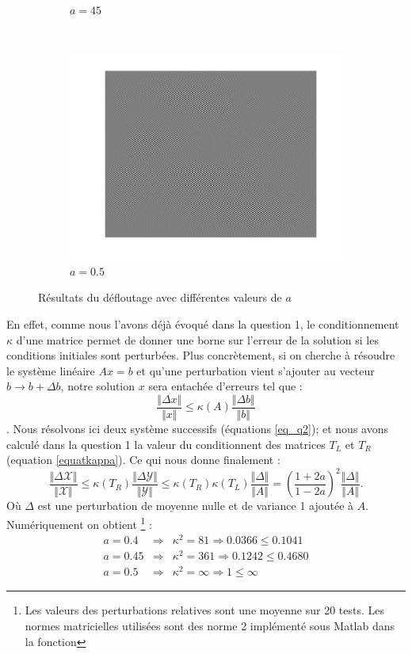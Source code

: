 \begin{figure}
\begin{subfigure}[b]{0.3\textwidth}
    \caption{$a = 45$}
    \label{fig:a45}
  \end{subfigure}%
  ~
  \begin{subfigure}[b]{0.3\textwidth}
    \includegraphics[width=\textwidth]{Q2/unblurred_50.png}
    \caption{$a = 0.5$}
    \label{fig:a5}
  \end{subfigure}
  \caption{Résultats du défloutage avec différentes valeurs de $a$}\label{fig:adiff}
\end{figure}



En effet, comme nous l'avons déjà évoqué dans la question 1, le conditionnement $\kappa$ d'une matrice permet de donner une borne sur l'erreur de la solution si les conditions initiales sont perturbées. Plus concrètement, si on cherche à résoudre le système linéaire $Ax=b$ et qu'une perturbation vient s'ajouter au vecteur $b\rightarrow b+\Delta b$, notre solution $x$ sera entachée d'erreurs tel que : 
$$\frac{\Vert \Delta x \Vert}{\Vert x \Vert} \leq \kappa(A) \frac{\Vert \Delta b \Vert}{\Vert b \Vert} $$. 
Nous résolvons ici deux système successifs (équations \ref{eq_q2}); et nous avons calculé dans la question 1 la valeur du conditionnent des matrices $T_L$ et $T_R$ (equation \ref{equatkappa}). Ce qui nous donne finalement : 
$$\frac{\Vert \Delta \mathcal{X} \Vert}{\Vert \mathcal{X} \Vert} \leq \kappa (T_R) \frac{\Vert \Delta \mathcal{Y} \Vert}{\Vert \mathcal{Y} \Vert} \leq \kappa(T_R) \kappa (T_L) \frac{\Vert \Delta \Vert}{\Vert A \Vert} = \left(\frac{1+2a}{1-2a}\right)^2  \frac{\Vert \Delta \Vert}{\Vert A \Vert}. $$
Où $\Delta$ est une perturbation de moyenne nulle et de variance 1 ajoutée à $A$. Numériquement on obtient \footnote{Les valeurs des perturbations relatives sont une moyenne sur 20 tests. Les normes matricielles utilisées sont des norme 2 implémenté sous Matlab dans la fonction } : 
\begin{eqnarray}
a=0.4  &\Longrightarrow & \kappa^2 = 81 \Longrightarrow 0.0366 \leq  0.1041\\
a=0.45  &\Longrightarrow & \kappa^2 = 361 \Longrightarrow  0.1242 \leq  0.4680\\
a=0.5  &\Longrightarrow &  \kappa^2 = \infty \Longrightarrow 1 \leq \infty 
\end{eqnarray}

